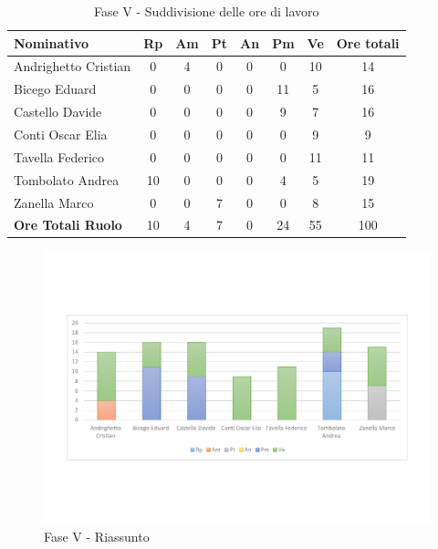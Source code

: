 \documentclass[../PianoProgetto.tex]{subfiles}
\begin{document}
	\begin{table}[h]
		\begin{tabularx}{\textwidth}{l  * {6}{C}  c}
			\toprule
			\textbf{Nominativo} & \textbf{Rp} & \textbf{Am} & \textbf{Pt} 
						& \textbf{An} & \textbf{Pm} & \textbf{Ve} & \textbf{Ore totali} \\
			\midrule
			Andrighetto Cristian & 0 & 4 & 0 & 0 & 0 & 10 & 14 \\
			Bicego Eduard & 0 & 0 &	0 &	0 &	11 & 5 & 16 \\
			Castello Davide & 0 & 0 & 0 & 0 & 9 & 7 & 16 \\
			Conti Oscar Elia &0 & 0 & 0 & 0 & 0 & 9 & 9 \\
			Tavella Federico &	0 & 0 & 0 & 0 & 0 & 11 & 11 \\
			Tombolato Andrea & 10 & 0 & 0 & 0 & 4 & 5 & 19 \\
			Zanella Marco & 0 & 0 & 7 & 0 & 0 & 8 & 15 \\
			\midrule			
			\textbf{Ore Totali Ruolo} & 10 & 4 &	7 &	0 &	24 & 55 & 100 \\
			\bottomrule
		\end{tabularx}
		\caption{Fase V - Suddivisione delle ore di lavoro}
		\label{tab:faseV_ore}
	\end{table}
\vfill	

	
	\begin{figure}[!h]
		\centering
		\includegraphics[width=\textwidth , trim=2cm 5cm 2cm 5cm]{grafici/V/V-ore-persona}
			\caption{Fase V - Riassunto}
		\label{fig:BarChart-faseV_ore}
	\end{figure}
\vfill	
\newpage
\vfill
\end{document}
